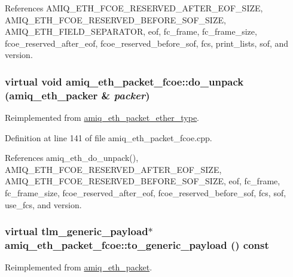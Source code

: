 References AMIQ\_\-ETH\_\-FCOE\_\-RESERVED\_\-AFTER\_\-EOF\_\-SIZE, AMIQ\_\-ETH\_\-FCOE\_\-RESERVED\_\-BEFORE\_\-SOF\_\-SIZE, AMIQ\_\-ETH\_\-FIELD\_\-SEPARATOR, eof, fc\_\-frame, fc\_\-frame\_\-size, fcoe\_\-reserved\_\-after\_\-eof, fcoe\_\-reserved\_\-before\_\-sof, fcs, print\_\-lists, sof, and version.\hypertarget{classamiq__eth__packet__fcoe_afb550561999badc5693283b852be2f70}{
\subsubsection[{do\_\-unpack}]{\setlength{\rightskip}{0pt plus 5cm}virtual void amiq\_\-eth\_\-packet\_\-fcoe::do\_\-unpack ({\bf amiq\_\-eth\_\-packer} \& {\em packer})}}
\label{classamiq__eth__packet__fcoe_afb550561999badc5693283b852be2f70}


Reimplemented from \hyperlink{classamiq__eth__packet__ether__type_a0c86ef80c46bbed384739b23e5efb0ef}{amiq\_\-eth\_\-packet\_\-ether\_\-type}.

Definition at line 141 of file amiq\_\-eth\_\-packet\_\-fcoe.cpp.

References amiq\_\-eth\_\-do\_\-unpack(), AMIQ\_\-ETH\_\-FCOE\_\-RESERVED\_\-AFTER\_\-EOF\_\-SIZE, AMIQ\_\-ETH\_\-FCOE\_\-RESERVED\_\-BEFORE\_\-SOF\_\-SIZE, eof, fc\_\-frame, fc\_\-frame\_\-size, fcoe\_\-reserved\_\-after\_\-eof, fcoe\_\-reserved\_\-before\_\-sof, fcs, sof, use\_\-fcs, and version.\hypertarget{classamiq__eth__packet__fcoe_aa341b2f7df8abf278713e98015565c9f}{
\subsubsection[{to\_\-generic\_\-payload}]{\setlength{\rightskip}{0pt plus 5cm}virtual tlm\_\-generic\_\-payload$\ast$ amiq\_\-eth\_\-packet\_\-fcoe::to\_\-generic\_\-payload () const}}
\label{classamiq__eth__packet__fcoe_aa341b2f7df8abf278713e98015565c9f}


Reimplemented from \hyperlink{classamiq__eth__packet_a6dd92751d8172eeaa347d71bb415b0d5}{amiq\_\-eth\_\-packet}.

